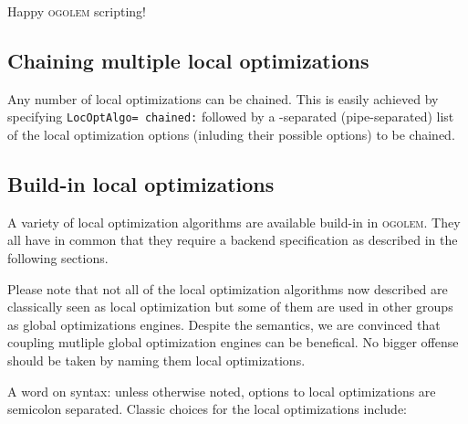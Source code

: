 \documentclass[a4paper,10pt]{scrbook}
\newcommand{\ogo}{\textsc{ogolem}}
\begin{document}
Happy \ogo{} scripting!

\subsection{Chaining multiple local optimizations}
Any number of local optimizations can be chained. This is easily achieved by
specifying \texttt{LocOptAlgo= chained:} followed by a
\texttt{\textbar}-separated (pipe-separated) list of the local optimization
options (inluding their possible options) to be chained.

\subsection{Build-in local optimizations}
\label{sec:geomlocopt}
A variety of local optimization algorithms are available build-in in \ogo{}. 
They all have in common that they require a backend specification as described 
in the following sections.

Please note that not all of the local optimization algorithms now described are 
classically seen as local optimization but some of them are used in other 
groups as global optimizations engines. Despite the semantics, we are convinced 
that coupling mutliple global optimization engines can be benefical. No bigger 
offense should be taken by naming them local optimizations.

A word on syntax: unless otherwise noted, options to local optimizations are 
semicolon separated. Classic choices for the local optimizations include:
\end{document}
